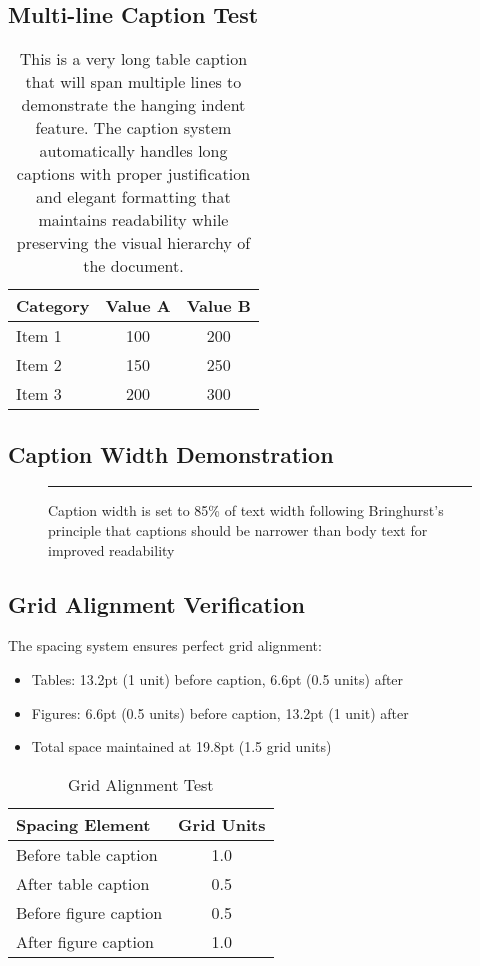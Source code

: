 \documentclass[11pt,a4paper]{article}
\begin{document}
\subsection{Multi-line Caption Test}

\begin{table}[tbp]
  \caption{This is a very long table caption that will span multiple lines to demonstrate the hanging indent feature. The caption system automatically handles long captions with proper justification and elegant formatting that maintains readability while preserving the visual hierarchy of the document.}
  \centering
  \begin{tabular}{@{}lcc@{}}
    \toprule
    Category & Value A & Value B \\
    \midrule
    Item 1 & 100 & 200 \\
    Item 2 & 150 & 250 \\
    Item 3 & 200 & 300 \\
    \bottomrule
  \end{tabular}
\end{table}

\subsection{Caption Width Demonstration}

\lipsum[1]

\begin{figure}[tbp]
  \centering
  \rule{0.5\textwidth}{0.3\textwidth}
  \caption{Caption width is set to 85\% of text width following Bringhurst's principle that captions should be narrower than body text for improved readability}
  \label{fig:width-demo}
\end{figure}

\subsection{Grid Alignment Verification}

The spacing system ensures perfect grid alignment:
\begin{itemize}
\item Tables: 13.2pt (1 unit) before caption, 6.6pt (0.5 units) after
\item Figures: 6.6pt (0.5 units) before caption, 13.2pt (1 unit) after
\item Total space maintained at 19.8pt (1.5 grid units)
\end{itemize}

\begin{table}[tbp]
  \caption{Grid Alignment Test}
  \centering
  \begin{tabular}{@{}lc@{}}
    \toprule
    Spacing Element & Grid Units \\
    \midrule
    Before table caption & 1.0 \\
    After table caption & 0.5 \\
    Before figure caption & 0.5 \\
    After figure caption & 1.0 \\
    \bottomrule
  \end{tabular}
\end{table}
\end{document}
